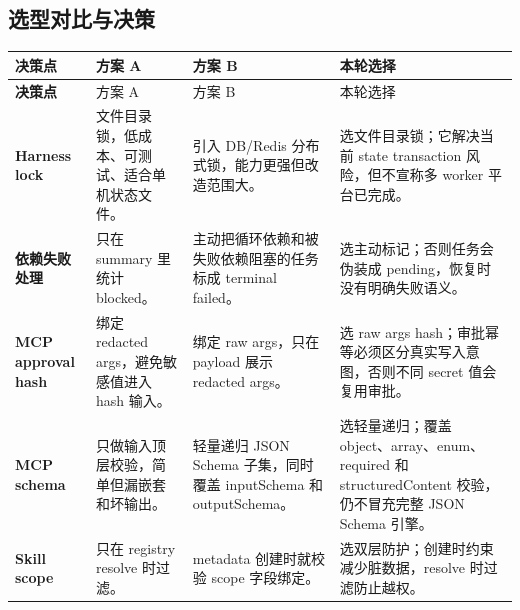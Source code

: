 \subsection{选型对比与决策}
\begin{longtable}{>{\bfseries}p{}p{}p{}p{}}
\toprule
决策点 & 方案 A & 方案 B & 本轮选择 \\
\midrule
\endfirsthead
\toprule
决策点 & 方案 A & 方案 B & 本轮选择 \\
\midrule
\endhead
Harness lock & 文件目录锁，低成本、可测试、适合单机状态文件。 & 引入 DB/Redis 分布式锁，能力更强但改造范围大。 & 选文件目录锁；它解决当前 state transaction 风险，但不宣称多 worker 平台已完成。 \\
依赖失败处理 & 只在 summary 里统计 blocked。 & 主动把循环依赖和被失败依赖阻塞的任务标成 terminal failed。 & 选主动标记；否则任务会伪装成 pending，恢复时没有明确失败语义。 \\
MCP approval hash & 绑定 redacted args，避免敏感值进入 hash 输入。 & 绑定 raw args，只在 payload 展示 redacted args。 & 选 raw args hash；审批幂等必须区分真实写入意图，否则不同 secret 值会复用审批。 \\
MCP schema & 只做输入顶层校验，简单但漏嵌套和坏输出。 & 轻量递归 JSON Schema 子集，同时覆盖 inputSchema 和 outputSchema。 & 选轻量递归；覆盖 object、array、enum、required 和 structuredContent 校验，仍不冒充完整 JSON Schema 引擎。 \\
Skill scope & 只在 registry resolve 时过滤。 & metadata 创建时就校验 scope 字段绑定。 & 选双层防护；创建时约束减少脏数据，resolve 时过滤防止越权。 \\
\bottomrule
\end{longtable}

